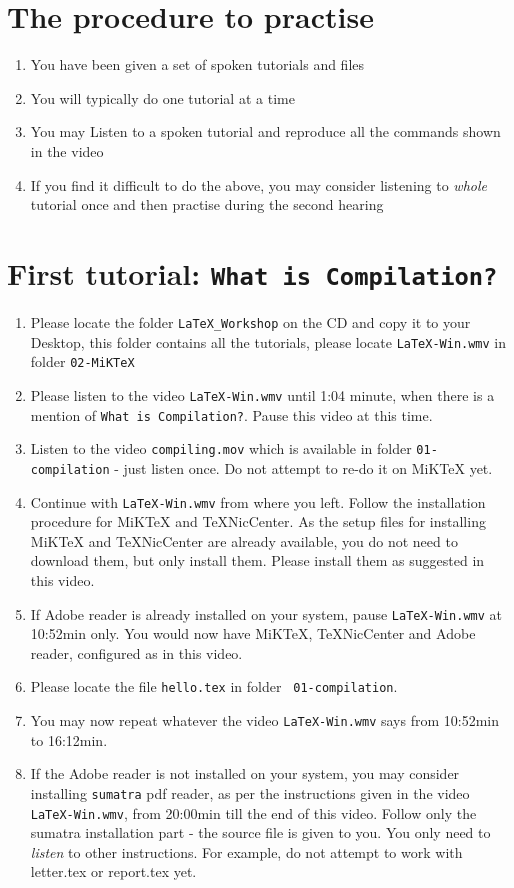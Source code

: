 \documentclass[11pt]{article}
\newenvironment{enumcpt}{\begin{enumerate} \topsep 0pt \partopsep 0pt 
                        \parsep 0pt
                        \itemsep 0pt \leftmargin -1in \rightmargin 0pt
                        }{\end{enumerate}}
\begin{document}
\begin{multicols}{2}

\section{The procedure to practise}
\begin{enumcpt}
\item You have been given a set of spoken tutorials and files
\item You will typically do one tutorial at a time
\item You may Listen to a spoken tutorial and reproduce all the
  commands shown in the video
\item If you find it difficult to do the above, you may consider
  listening to \emph{whole} tutorial once and then practise during
  the second hearing
\end{enumcpt}

\section{First tutorial: {\tt What is
    Compilation?}}
\begin{enumerate}
\item Please locate the folder {\tt LaTeX\_Workshop} on the CD and
  copy it to your Desktop, this folder contains all the tutorials,
  please locate {\tt LaTeX-Win.wmv} in folder {\tt 02-MiKTeX}
\item Please listen to the video {\tt LaTeX-Win.wmv} until 1:04
  minute, when there is a mention of {\tt What is Compilation?}.
  Pause this video at this time.
\item Listen to the video {\tt compiling.mov} which is available in
  folder {\tt 01-compilation} - just listen once.  Do not attempt to
  re-do it on MiKTeX yet.
\item Continue with {\tt LaTeX-Win.wmv} from where you left.  Follow
  the installation procedure for MiKTeX and TeXNicCenter.  As the
  setup files for installing MiKTeX and TeXNicCenter are already
  available, you do not need to download them, but only install them.
  Please install them as suggested in this video.
\item If Adobe reader is already installed on your system, pause
  {\tt LaTeX-Win.wmv} at 10:52min only.  You would now have MiKTeX,
  TeXNicCenter and Adobe reader, configured as in this video.  
\item Please locate the file {\tt hello.tex} in folder {\tt
  01-compilation}.
\item You may now repeat whatever the video {\tt LaTeX-Win.wmv} says
  from 10:52min to 16:12min.
\item If the Adobe reader is not installed on your system, you may
  consider installing {\tt sumatra} pdf reader, as per the
  instructions given in the video {\tt LaTeX-Win.wmv}, from 20:00min
  till the end of this video.  Follow only the sumatra installation
  part - the source file is given to you. You only need to
  \emph{listen} to other instructions.  For example, do not attempt to
  work with letter.tex or report.tex yet.
\end{enumerate}


\end{multicols}
\end{document}

